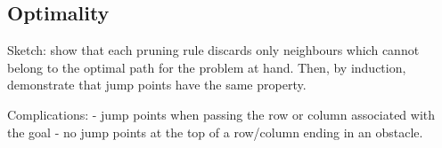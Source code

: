 \subsection{Optimality}
Sketch: show that each pruning rule discards only neighbours
which cannot belong to the optimal path for the problem at hand.
Then, by induction, demonstrate that jump points have the same 
property. 

Complications:
 - jump points when passing the row or column associated with the goal
 - no jump points at the top of a row/column ending in an obstacle.

